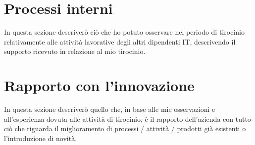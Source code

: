 \section{Processi interni}

In questa sezione descriverò ciò che ho potuto osservare nel periodo di tirocinio relativamente alle attività lavorative degli altri dipendenti IT, descrivendo il supporto ricevuto in relazione al mio tirocinio.


\section{Rapporto con l'innovazione}

In questa sezione descriverò quello che, in base alle mie osservazioni e all'esperienza dovuta alle attività di tirocinio, è il rapporto dell'azienda con tutto ciò che riguarda il miglioramento di processi / attività / prodotti già esistenti o l'introduzione di novità.